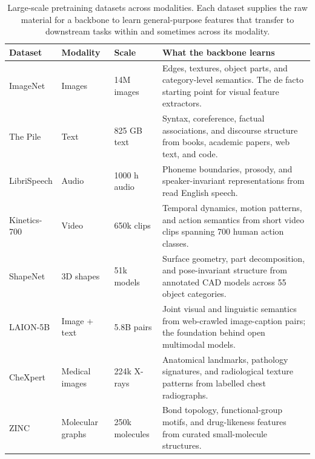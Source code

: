 \begin{table}[ht]
\centering
\begin{tabular}{p{}p{}p{}p{}}
    \toprule
    \textbf{Dataset} & \textbf{Modality} & \textbf{Scale} & \textbf{What the backbone learns} \\
    \midrule
    ImageNet \citealt{Deng2009ImageNet} & Images & 14M images & Edges, textures, object parts, and category-level semantics. The de facto starting point for visual feature extractors. \\
    The Pile \citealt{Gao2020Pile} & Text & 825 GB text & Syntax, coreference, factual associations, and discourse structure from books, academic papers, web text, and code. \\
    LibriSpeech \citealt{Panayotov2015LibriSpeech} & Audio & 1000 h audio & Phoneme boundaries, prosody, and speaker-invariant representations from read English speech. \\
    Kinetics-700 \citealt{Carreira2022Kinetics700} & Video & 650k clips & Temporal dynamics, motion patterns, and action semantics from short video clips spanning 700 human action classes. \\
    ShapeNet \citealt{Chang2015ShapeNet} & 3D shapes & 51k models & Surface geometry, part decomposition, and pose-invariant structure from annotated CAD models across 55 object categories. \\
    LAION-5B \citealt{Schuhmann2022LAION5B} & Image + text & 5.8B pairs & Joint visual and linguistic semantics from web-crawled image-caption pairs; the foundation behind open multimodal models. \\
    CheXpert \citealt{Irvin2019CheXpert} & Medical images & 224k X-rays & Anatomical landmarks, pathology signatures, and radiological texture patterns from labelled chest radiographs. \\
    ZINC \citealt{Sterling2015ZINC} & Molecular graphs & 250k molecules & Bond topology, functional-group motifs, and drug-likeness features from curated small-molecule structures. \\
    \bottomrule
\end{tabular}
\vspace{2em}
\caption{Large-scale pretraining datasets across modalities. Each dataset supplies the raw material for a backbone to learn general-purpose features that transfer to downstream tasks within and sometimes across its modality.}
\label{tab:pretraining_datasets}
\end{table}

